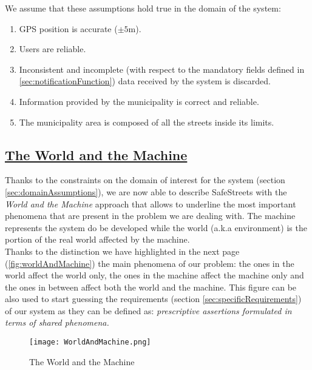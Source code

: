 	We assume that these assumptions hold true in the domain of the system:
		
	\begin{enumerate}[label=\textbf{DA\arabic*}]
		\item GPS position is accurate ($\pm5$m).
		\item Users are reliable.
		\item Inconsistent and incomplete (with respect to the mandatory fields defined in \ref{sec:notificationFunction}) data received by the system is discarded.
		\item Information provided by the municipality is correct and reliable.
		\item The municipality area is composed of all the streets inside its limits.
	\end{enumerate} 
	
\subsection[The World and the Machine]{\hyperlink{toc}{The World and the Machine}}
	Thanks to the constraints on the domain of interest for the system (section \ref{sec:domainAssumptions}), we are now able to describe SafeStreets with the \textit{World and the Machine} approach that allows to underline the most important phenomena that are present in the problem we are dealing with. The machine represents the system do be developed while the world (a.k.a environment) is the portion of the real world affected by the machine.\\
	
	Thanks to the distinction we have highlighted in the next page (\autoref{fig:worldAndMachine}) the main phenomena of our problem: the ones in the world affect the world only, the ones in the machine affect the machine only and the ones in between affect both the world and the machine. This figure can be also used to start guessing the requirements (section \ref{sec:specificRequirements}) of our system as they can be defined as: \textit{prescriptive assertions formulated in terms of shared phenomena.} 
	
	\begin{figure}[h]
		\centering
		\texttt{[image: WorldAndMachine.png]}
		\caption{\label{fig:worldAndMachine}The World and the Machine}
	\end{figure}
 